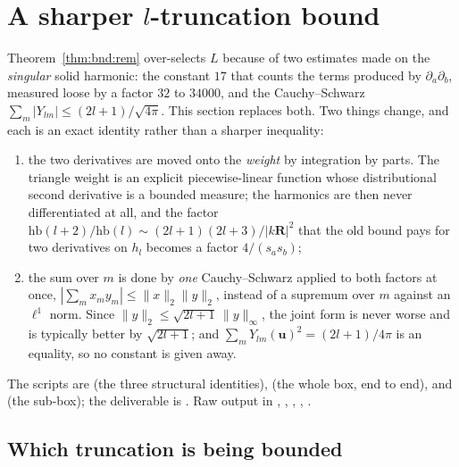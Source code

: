 \section{A sharper \texorpdfstring{$l$}{l}-truncation bound}
\label{sec:bnd2}

Theorem~\ref{thm:bnd:rem} over-selects $L$ because of two estimates made on the
\emph{singular} solid harmonic: the constant $17$ that counts the terms produced by
$\partial_a\partial_b$, measured loose by a factor $32$ to $34000$, and the
Cauchy--Schwarz $\sum_m|Y_{lm}| \le (2l+1)/\sqrt{4\pi}$. This section replaces both. Two
things change, and each is an exact identity rather than a sharper inequality:

\begin{enumerate}[nosep,leftmargin=1.6em]
\item the two derivatives are moved onto the \emph{weight} by integration by parts. The
triangle weight is an explicit piecewise-linear function whose distributional second
derivative is a bounded measure; the harmonics are then never differentiated at all, and
the factor $\mathrm{hb}(l+2)/\mathrm{hb}(l) \sim (2l+1)(2l+3)/|k\mathbf{R}|^2$ that the old
bound pays for two derivatives on $h_l$ becomes a factor $4/(s_as_b)$;
\item the sum over $m$ is done by \emph{one} Cauchy--Schwarz applied to both factors at
once, $|\sum_m x_my_m| \le \|x\|_2\|y\|_2$, instead of a supremum over $m$ against an
$\ell^1$ norm. Since $\|y\|_2 \le \sqrt{2l+1}\,\|y\|_\infty$, the joint form is never worse
and is typically better by $\sqrt{2l+1}$; and $\sum_m Y_{lm}(\mathbf{u})^2 = (2l+1)/4\pi$
is an equality, so no constant is given away.
\end{enumerate}

\noindent
The scripts are  (the three structural identities),  (the
whole box, end to end),  and  (the sub-box); the deliverable
is . Raw output in , ,
, , .

\subsection{Which truncation is being bounded}
\label{sec:bnd2:which}

